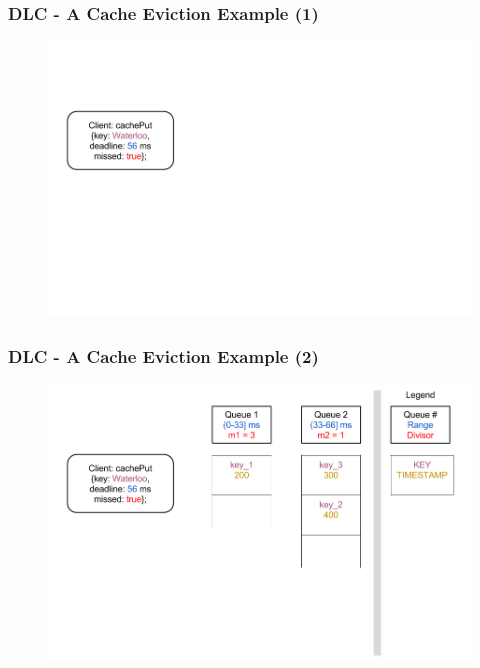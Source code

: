 \documentclass{beamer}
\begin{document}

\begin{frame}
  \frametitle{DLC - A Cache Eviction Example (1)}
  \begin{figure}
    \begin{center}
      \centerline{\includegraphics[scale=0.37]{img/DLC_V8_01.png}}
    \end{center}
  \end{figure}
\end{frame}


\begin{frame}
  \frametitle{DLC - A Cache Eviction Example (2)}
  \begin{figure}
    \begin{center}
      \centerline{\includegraphics[scale=0.37]{img/DLC_V8_02.png}}
    \end{center}
  \end{figure}
\end{frame}
\end{document}
